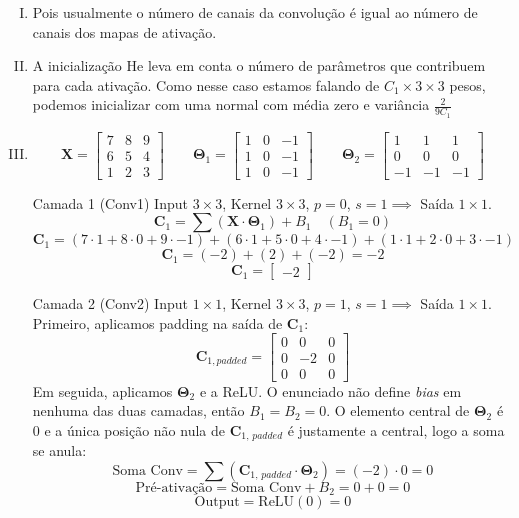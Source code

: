 \documentclass{dlproblemset}
\begin{document}
\begin{enumerate}[I)]
\item Pois usualmente o número de canais da convolução é igual ao número de canais dos mapas de ativação.

\item A inicialização He leva em conta o número de parâmetros que contribuem para cada ativação. Como nesse caso estamos falando de $C_1\times3\times3$ pesos, podemos inicializar com uma normal com média zero e variância $\frac{2}{9C_1}$

\item %
    $$
    \mathbf{X} = \begin{bmatrix}
    7 & 8 & 9 \\
    6 & 5 & 4 \\
    1 & 2 & 3
    \end{bmatrix}
    \qquad
    \mathbf{\Theta}_1 = \begin{bmatrix}
    1 & 0 & -1 \\
    1 & 0 & -1 \\
    1 & 0 & -1
    \end{bmatrix}
    \qquad
    \mathbf{\Theta}_2 = \begin{bmatrix}
    1 & 1 & 1 \\
    0 & 0 & 0 \\
    -1 & -1 & -1
    \end{bmatrix}
    $$

    Camada 1 (Conv1)
    Input $3\times3$, Kernel $3\times3$, $p=0$, $s=1 \implies$ Saída $1\times1$.
    $$
    \mathbf{C}_1 = \sum(\mathbf{X} \cdot \mathbf{\Theta}_1) + B_1 \quad (B_1 = 0)
    $$
    $$
    \mathbf{C}_1 = (7\cdot1 + 8\cdot0 + 9\cdot-1) + (6\cdot1 + 5\cdot0 + 4\cdot-1) + (1\cdot1 + 2\cdot0 + 3\cdot-1)
    $$
    $$
    \mathbf{C}_1 = (-2) + (2) + (-2) = -2
    $$
    $$
    \mathbf{C}_1 = \begin{bmatrix} -2 \end{bmatrix}
    $$

    Camada 2 (Conv2)
    Input $1\times1$, Kernel $3\times3$, $p=1$, $s=1 \implies$ Saída $1\times1$.
    Primeiro, aplicamos padding na saída de $\mathbf{C}_1$:
    $$
    \mathbf{C}_{1, padded} = \begin{bmatrix}
    0 & 0 & 0 \\
    0 & -2 & 0 \\
    0 & 0 & 0
    \end{bmatrix}
    $$
    Em seguida, aplicamos $\mathbf{\Theta}_2$ e a ReLU. O enunciado não define \textit{bias} em nenhuma das duas camadas, então $B_1 = B_2 = 0$. O elemento central de $\mathbf{\Theta}_2$ é $0$ e a única posição não nula de $\mathbf{C}_{1,\,padded}$ é justamente a central, logo a soma se anula:
    $$
    \text{Soma Conv} = \sum(\mathbf{C}_{1,\,padded} \cdot \mathbf{\Theta}_2) = (-2) \cdot 0 = 0
    $$
    $$
    \text{Pré-ativação} = \text{Soma Conv} + B_2 = 0 + 0 = 0
    $$
    $$
    \text{Output} = \text{ReLU}(0) = 0
    $$


\end{enumerate}
\end{document}
